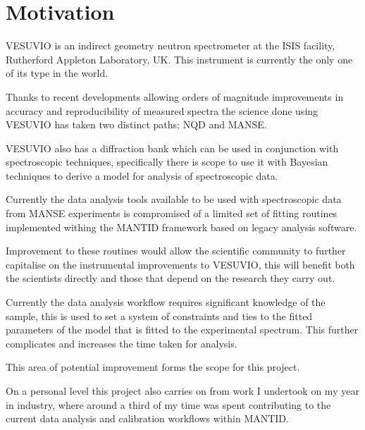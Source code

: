 \documentclass[a4paper,11pt]{article}
\title{\DOCTITLE}
\author{\DOCAUTHOR}
\date{\DOCDATE}
\begin{document}
\maketitle

\begin{abstract}
  This document will give an overview of the problem my project will aim to
  solve, the research I have undertaken into the problem and the means by which
  I intend to solve it.
\end{abstract}


\section{Motivation}
\label{sec:motivation}

VESUVIO is an indirect geometry neutron spectrometer at the ISIS facility,
Rutherford Appleton Laboratory, UK. This instrument is currently the only one of
its type in the world.

Thanks to recent developments allowing orders of magnitude improvements in
accuracy and reproducibility of measured spectra the science done using VESUVIO
has taken two distinct paths; \gls*{NQD} and \gls*{MANSE}.

VESUVIO also has a diffraction bank which can be used in conjunction with
spectroscopic techniques, specifically there is scope to use it with Bayesian
techniques to derive a model for analysis of spectroscopic data.

Currently the data analysis tools available to be used with spectroscopic data
from \gls*{MANSE} experiments is compromised of a limited set of fitting
routines implemented withing the \gls*{MANTID} framework \cite{mantid} based on
legacy analysis software.

Improvement to these routines would allow the scientific community to further
capitalise on the instrumental improvements to VESUVIO, this will benefit both
the scientists directly and those that depend on the research they carry out.

Currently the data analysis workflow requires significant knowledge of the
sample, this is used to set a system of constraints and ties to the fitted
parameters of the model that is fitted to the experimental spectrum. This
further complicates and increases the time taken for analysis.

This area of potential improvement forms the scope for this project.

On a personal level this project also carries on from work I undertook on my
year in industry, where around a third of my time was spent contributing to the
current data analysis and calibration workflows within \gls*{MANTID}.
\end{document}
